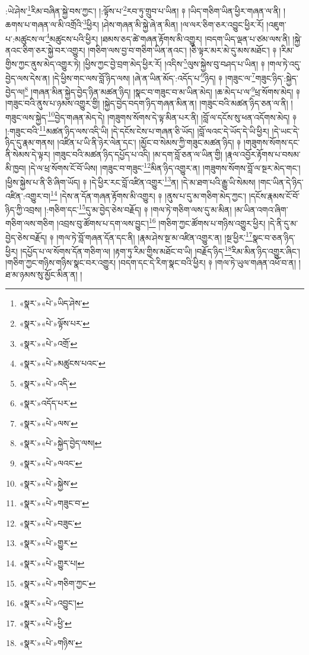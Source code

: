 :ཡེ་ཤེས་\footnote{«སྣར་»«པེ་»ཡིད་ཤེས་}རིམ་བཞིན་སྐྱེ་བས་ཀྱང་། །:ལྟོས་པ་\footnote{«སྣར་»«པེ་»ལྟོས་པར་}རབ་ཏུ་གྲུབ་པ་ཡིན། ༈ །ཡིད་གཅིག་ཡིན་ཕྱིར་གཞན་ལ་ནི། །ཆགས་པ་གཞན་ལ་མི་འགྲོའི་\footnote{«སྣར་»«པེ་»འགྲོ་}ཕྱིར། །ཤེས་གཞན་མི་སྐྱེ་ཞེ་ན་མིན། །ལ་ལར་ཅིག་ཅར་འབྱུང་ཕྱིར་རོ། །འཇུག་པ་:མཚུངས་ལ་\footnote{«སྣར་»«པེ་»མཚུངས་པའང་}མཚུངས་པའི་ཕྱིར། །ཐམས་ཅད་ཚེ་གཞན་རྟོགས་མི་འགྱུར། །བདག་ཡིད་ལྡན་པ་ཙམ་ལས་ནི། །སྐྱེ་ནའང་ཅིག་ཅར་སྐྱེ་བར་འགྱུར། །གཅིག་ལས་བྱ་བ་གཅིག་ཡིན་ནའང་། །ཅི་ལྟར་མར་མེ་དུ་མས་མཐོང་། ༈ །རིམ་གྱིས་ཀྱང་ནུས་མེད་འགྱུར་ཏེ། །ཕྱིས་ཀྱང་བྱེ་བྲག་མེད་ཕྱིར་རོ། །འདིས་\footnote{«སྣར་»«པེ་»འདི་}ལུས་སྐྱེས་བུ་བཤད་པ་ཡིན། ༈ །གལ་ཏེ་འདུ་བྱེད་ལས་དེས་ན། །དེ་ཕྱིས་གང་ལས་བློ་ཉིད་ལས། །ཞེ་ན་ཡིན་མོད་:འདོད་པ་\footnote{«སྣར་»འདོད་པར་}ཉིད། ༈ །གཟུང་ལ་\footnote{«སྣར་»«པེ་»ལས་}གཟུང་ཉིད་:སྐྱེད་བྱེད་ལ།\footnote{«སྣར་»«པེ་»སྐྱེད་བྱེད་ལས།} །གཞན་མིན་སྐྱེད་བྱེད་ཉིན་མཚན་ཉིད། །སྣང་བ་གཟུང་བ་མ་ཡིན་མེད། །ཆ་མེད་པ་ལ་\footnote{«སྣར་»«པེ་»ལའང་}ཕྲ་སོགས་མེད། ༈ །གཟུང་བའི་ནུས་པ་ཉམས་འགྱུར་གྱི། །སྐྱེད་བྱེད་བདག་ཉིད་གཞན་མིན་ན། །གཟུང་བའི་མཚན་ཉིད་ཅན་ལ་ནི། །གཟུང་ལས་སྐྱེད་\footnote{«སྣར་»«པེ་»སྐྱེས་}བྱེད་གཞན་མེད་དེ། །གཟུགས་སོགས་དེ་ལྟ་མིན་པར་ནི། །བློ་ལ་དངོས་སུ་ཕན་འདོགས་མེད། ༈ །:གཟུང་བའི་\footnote{«སྣར་»«པེ་»གཟུང་བ་}མཚན་ཉིད་ལས་འདི་ཡི། །དེ་དངོས་ངེས་པ་གཞན་ཅི་ཡོད། །བློ་ལའང་དེ་ཡོད་དེ་ཡི་ཕྱིར། །དེ་ཡང་དེ་ཉིད་དུ་རྣམ་གནས། །འཛིན་པ་ཡི་ནི་ཉེར་ལེན་དང་། །མྱོང་བ་སེམས་ཀྱི་གཟུང་མཚན་ཉིད། ༈ །གཟུགས་སོགས་དང་ནི་སེམས་དེ་ལྟར། །གཟུང་བའི་མཚན་ཉིད་དཔྱོད་པ་འདི། །མ་དག་བློ་ཅན་ལ་ཡིན་གྱི། །རྣལ་འབྱོར་རྟོགས་པ་བསམ་མི་ཁྱབ། །དེ་ལ་ཕྲ་སོགས་ངོ་བོ་ཡིས། །གཟུང་བ་གཟུང་\footnote{«སྣར་»«པེ་»བཟུང་}མིན་ཉིད་འགྱུར་ན། །གཟུགས་སོགས་བློ་ལ་སྔར་མེད་གང་། །ཕྱིས་སྐྱེས་པ་ནི་ཅི་ཞིག་ཡོད། ༈ །དེ་ཕྱིར་རང་བློ་འཛིན་འགྱུར་\footnote{«སྣར་»«པེ་»གྱུར་}ན། །དེ་མ་ཐག་པའི་རྒྱུ་ཡི་སེམས། །གང་ཡིན་དེ་ཉིད་འཛིན་:འགྱུར་བ།\footnote{«སྣར་»«པེ་»གྱུར་པ།} །དེས་ན་དོན་གཞན་རྟོགས་མི་འགྱུར། ༈ །ནུས་པ་དུ་མ་གཅིག་མེད་ཀྱང་། །དངོས་རྣམས་ངོ་བོ་ཉིད་ཀྱི་འབྲས། །:གཅིག་དང་\footnote{«སྣར་»«པེ་»གཅིག་ཀྱང་}དུ་མ་བྱེད་ཅེས་བརྗོད། ༈ །གལ་ཏེ་གཅིག་ལས་དུ་མ་མིན། །མ་ཡིན་འགའ་ཞིག་གཅིག་ལས་གཅིག །འབྲས་བུ་ཚོགས་པ་དག་ལས་བྱུང་།\footnote{«སྣར་»«པེ་»འབྱུང་།} །གཅིག་ཀྱང་ཚོགས་པ་གཉིས་འགྱུར་ཕྱིར། །དེ་ནི་དུ་མ་བྱེད་ཅེས་བརྗོད། ༈ །གལ་ཏེ་བློ་གཞན་དོན་དང་ནི། །རྣམ་ཤེས་སྔ་མ་འཛིན་འགྱུར་ན། །སྔ་ཕྱིར་\footnote{«སྣར་»«པེ་»ཕྱི་}སྣང་བ་ཅན་ཉིད་ཕྱིར། །དཔྱོད་པ་ལ་སོགས་དོན་གཅིག་ལ། །རྟག་ཏུ་རིམ་གྱིས་མཐོང་བ་ཡི། །བརྗོད་ཉིད་\footnote{«སྣར་»«པེ་»གཉིས་}རིམ་མིན་ཉིད་འགྱུར་ཞིང་། །གཅིག་ཀྱང་གཉིས་གཉིས་སྣང་བར་འགྱུར། །བདག་དང་དེ་རིག་སྣང་བའི་ཕྱིར། ༈ །གལ་ཏེ་ཡུལ་གཞན་འཕོ་བ་ན། །ཐ་མ་ཉམས་སུ་མྱོང་མིན་ན། །

